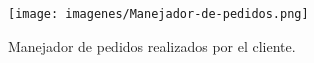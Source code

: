 \begin{figure}[H]
  \centering
  \texttt{[image: imagenes/Manejador-de-pedidos.png]}
  \caption{Manejador de pedidos realizados por el cliente.}
\end{figure}

